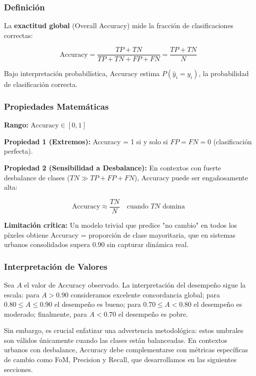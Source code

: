 \subsubsection{Definición}

La \textbf{exactitud global} (Overall Accuracy) mide la fracción de clasificaciones correctas:

\begin{equation}
\text{Accuracy} = \frac{TP + TN}{TP + TN + FP + FN} = \frac{TP + TN}{N}
\label{eq:accuracy}
\end{equation}

Bajo interpretación probabilística, Accuracy estima $P(\hat{y}_i = y_i)$, la probabilidad de clasificación correcta.

\subsubsection{Propiedades Matemáticas}

\textbf{Rango:} $\text{Accuracy} \in [0, 1]$

\textbf{Propiedad 1 (Extremos):} Accuracy = 1 si y solo si $FP = FN = 0$ (clasificación perfecta).

\textbf{Propiedad 2 (Sensibilidad a Desbalance):} En contextos con fuerte desbalance de clases ($TN \gg TP + FP + FN$), Accuracy puede ser engañosamente alta:

\begin{equation}
\text{Accuracy} \approx \frac{TN}{N} \quad \text{cuando } TN \text{ domina}
\label{eq:acc_bias}
\end{equation}

\textbf{Limitación crítica:} Un modelo trivial que predice "no cambio" en todos los píxeles obtiene Accuracy = proporción de clase mayoritaria, que en sistemas urbanos consolidados supera 0.90 sin capturar dinámica real.

\subsubsection{Interpretación de Valores}

Sea $A$ el valor de Accuracy observado. La interpretación del desempeño sigue la escala: para $A > 0.90$ consideramos excelente concordancia global; para $0.80 \leq A \leq 0.90$ el desempeño es bueno; para $0.70 \leq A < 0.80$ el desempeño es moderado; finalmente, para $A < 0.70$ el desempeño es pobre.

Sin embargo, es crucial enfatizar una advertencia metodológica: estos umbrales son válidos únicamente cuando las clases están balanceadas. En contextos urbanos con desbalance, Accuracy debe complementarse con métricas específicas de cambio como FoM, Precision y Recall, que desarrollamos en las siguientes secciones.


